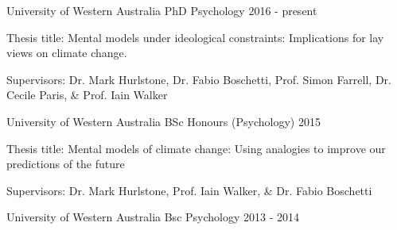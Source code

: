 

\begin{cventries}

  \cventry
    {University of Western Australia} %
    {PhD Psychology} %
    {}%
    {2016 - present} %
    {
      \begin{cvitems} %
        \item {Thesis title: Mental models under ideological constraints: Implications for lay views on climate change.}
        \item {Supervisors: Dr. Mark Hurlstone, Dr. Fabio Boschetti, Prof. Simon Farrell, Dr. Cecile Paris, \& Prof. Iain Walker}
      \end{cvitems}
    }

  \cventry
    {University of Western Australia} %
    {BSc Honours (Psychology)} %
    {} %
    {2015} %
    {
      \begin{cvitems} %
        \item {Thesis title: Mental models of climate change: Using analogies to improve our predictions of the future}
        \item {Supervisors: Dr. Mark Hurlstone, Prof. Iain Walker, \& Dr. Fabio Boschetti}
      \end{cvitems}
    }

  \cventry
    {University of Western Australia} %
    {Bsc Psychology} %
    {} %
    {2013 - 2014} %
    {}

\end{cventries}
